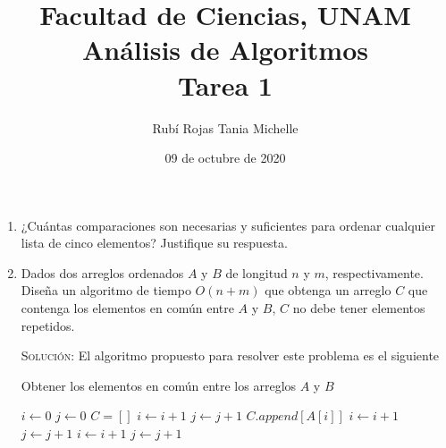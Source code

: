 \documentclass[letterpaper,11pt]{article}
\title{Facultad de Ciencias, UNAM \\ Análisis de Algoritmos \\ Tarea 1}
\author{Rubí Rojas Tania Michelle}
\date{09 de octubre de 2020}
\begin{document}
\maketitle

\begin{enumerate}
    \item ¿Cuántas comparaciones son necesarias y suficientes para ordenar 
    cualquier lista de cinco elementos? Justifique su respuesta.

    \item Dados dos arreglos ordenados $A$ y $B$ de longitud $n$ y $m$, 
    respectivamente. Diseña un algoritmo de tiempo $O(n + m)$ que obtenga un 
    arreglo $C$ que contenga los elementos en común entre $A$ y $B$, $C$ no 
    debe tener elementos repetidos.

    \textsc{Solución:} El algoritmo propuesto para resolver este problema es 
    el siguiente
    \begin{center}
    \begin{minipage}[c]{0.7\textwidth}
    \begin{algorithm}[H]
        \caption{Obtener los elementos en común entre los arreglos $A$ y $B$} 
        \begin{algorithmic}[1]
            \State $i \gets 0$
            \State $j \gets 0$
            \State $C = []$
                        \State $i \gets i + 1$
                        \State $j \gets j + 1$
                    \Else
                        \State $C.append[A[i]]$
                        \State $i \gets i + 1$
                        \State $j \gets j + 1$
                    \EndIf
                \Else {}
                    \State $i \gets i + 1$
                \Else
                    \State $j \gets j + 1$
                \EndIf
                \EndIf
            \EndWhile
        \end{algorithmic} 
    \end{algorithm}
    \end{minipage}
    \end{center}
   

\end{enumerate}
\end{document}

